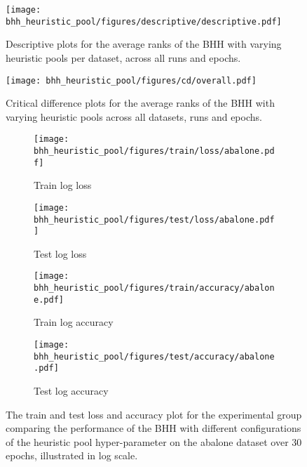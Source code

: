 \begin{figure}[htbp]
	\centering
	\texttt{[image: bhh\_heuristic\_pool/figures/descriptive/descriptive.pdf]}
	\caption{Descriptive plots for the average ranks of the \acs{BHH} with varying heuristic pools per dataset, across all runs and epochs.}
	\label{fig:results:heuristic_pool:descriptive:descriptive}
\end{figure}

\begin{figure}[htbp]
	\centering
	\texttt{[image: bhh\_heuristic\_pool/figures/cd/overall.pdf]}
	\caption{Critical difference plots for the average ranks of the \acs{BHH} with varying heuristic pools across all datasets, runs and epochs.}
	\label{fig:results:heuristic_pool:descriptive:cd}
\end{figure}


\begin{figure}[htbp]
	\begin{subfigure}{0.5\textwidth}
		\centering
		\texttt{[image: bhh\_heuristic\_pool/figures/train/loss/abalone.pdf]}
		\caption{Train log loss}
		\label{fig:results:heuristic_pool:figures:loss:train:abalone}
	\end{subfigure}
	\begin{subfigure}{0.5\textwidth}
		\centering
		\texttt{[image: bhh\_heuristic\_pool/figures/test/loss/abalone.pdf]}
		\caption{Test log loss}
		\label{fig:results:heuristic_pool:figures:loss:test:abalone}
	\end{subfigure}
	\par\bigskip
	\begin{subfigure}{0.5\textwidth}
		\centering
		\texttt{[image: bhh\_heuristic\_pool/figures/train/accuracy/abalone.pdf]}
		\caption{Train log accuracy}
		\label{fig:results:heuristic_pool:figures:accuracy:train:abalone}
	\end{subfigure}
	\begin{subfigure}{0.5\textwidth}
		\centering
		\texttt{[image: bhh\_heuristic\_pool/figures/test/accuracy/abalone.pdf]}
		\caption{Test log accuracy}
		\label{fig:results:heuristic_pool:figures:accuracy:test:abalone}
	\end{subfigure}
	\par\bigskip
	\caption{The train and test loss and accuracy plot for the experimental group comparing the performance of the \acs{BHH} with different configurations of the heuristic pool hyper-parameter on the abalone dataset over 30 epochs, illustrated in log scale.}
	\label{fig:results:heuristic_pool:figures:abalone}
\end{figure}



